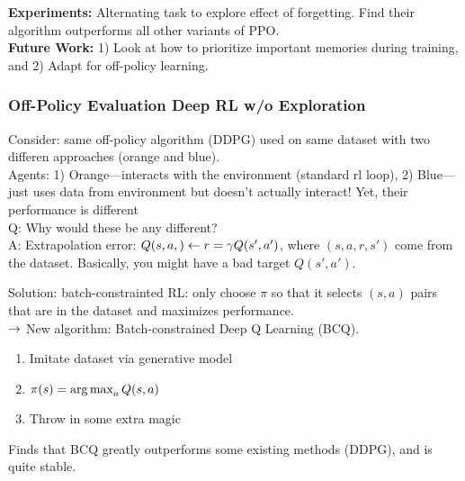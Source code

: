 {\bf Experiments:} Alternating task to explore effect of forgetting. Find their algorithm outperforms all other variants of PPO. \\

{\bf Future Work:} 1) Look at how to prioritize important memories during training, and 2) Adapt for off-policy learning. \\

\subsubsection{Off-Policy Evaluation Deep RL w/o Exploration~\cite{fujimoto2018off}}

Consider: same off-policy algorithm (DDPG) used on same dataset with two differen approaches (orange and blue). \\

Agents: 1) Orange---interacts with the environment (standard rl loop), 2) Blue---just uses data from environment but doesn't actually interact! Yet, their performance is different \\

Q: Why would these be any different? \\

A: Extrapolation error: $Q(s,a,) \leftarrow r = \gamma Q(s',a')$, where $(s,a,r,s')$ come from the dataset. Basically, you might have a bad target $Q(s',a')$.\\


Solution: batch-constrainted RL: only choose $\pi$ so that it selects $(s,a)$ pairs that are  in the dataset and maximizes performance. \\

$\rightarrow$ New algorithm: Batch-constrained Deep Q Learning (BCQ). \\
\begin{enumerate}
    \item Imitate dataset via generative model
    \item $\pi(s) = \operatorname*{arg\,max}_a Q(s,a)$
    \item Throw in some extra magic
\end{enumerate}

Finds that BCQ greatly outperforms some existing methods (DDPG), and is quite stable. \\

\spacerule

